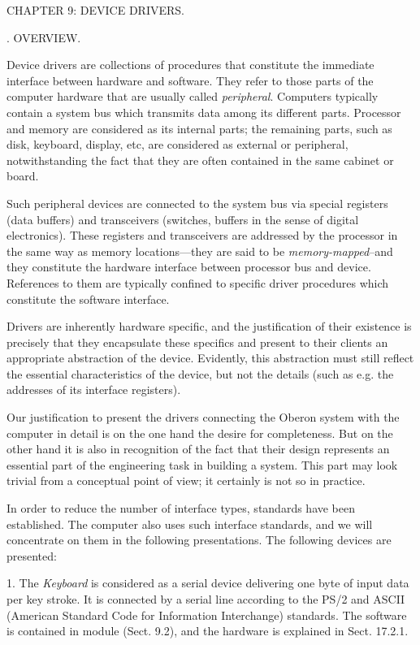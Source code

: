 \beginchapter CHAPTER 9: DEVICE DRIVERS.

. OVERVIEW.

Device drivers are collections of procedures that constitute the immediate interface between hardware and software. They refer to those parts of the computer hardware that are usually called \emph{peripheral}. Computers typically contain a system bus which transmits data among its different parts. Processor and memory are considered as its internal parts; the remaining parts, such as disk, keyboard, display, etc, are considered as external or peripheral, notwithstanding the fact that they are often contained in the same cabinet or board.

Such peripheral devices are connected to the system bus via special registers (data buffers) and transceivers (switches, buffers in the sense of digital electronics). These registers and transceivers are addressed by the processor in the same way as memory locations---they are said to be \emph{memory-mapped}--and they constitute the hardware interface between processor bus and device. References to them are typically confined to specific driver procedures which constitute the software interface.

Drivers are inherently hardware specific, and the justification of their existence is precisely that they encapsulate these specifics and present to their clients an appropriate abstraction of the device. Evidently, this abstraction must still reflect the essential characteristics of the device, but not the details (such as e.g. the addresses of its interface registers).

Our justification to present the drivers connecting the Oberon system with the \RISC computer in detail is on the one hand the desire for completeness. But on the other hand it is also in recognition of the fact that their design represents an essential part of the engineering task in building a system. This part may look trivial from a conceptual point of view; it certainly is not so in practice.

In order to reduce the number of interface types, standards have been established. The \RISC computer also uses such interface standards, and we will concentrate on them in the following presentations. The following devices are presented:

1. The \emph{Keyboard} is considered as a serial device delivering one byte of input data per key stroke. It is connected by a serial line according to the PS/2 and ASCII (American Standard Code for Information Interchange) standards. The software is contained in module  (Sect. 9.2), and the hardware is explained in Sect. 17.2.1.

